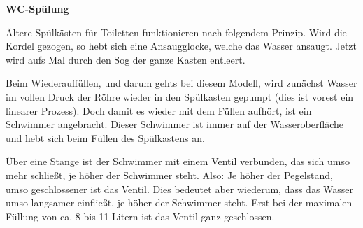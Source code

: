 
\bbwActAufgabenNr{} \textbf{WC-Spülung}\par
Ältere Spülkästen für Toiletten funktionieren nach folgendem Prinzip.
Wird die Kordel gezogen, so hebt sich eine
Ansaugglocke, welche das Wasser ansaugt. Jetzt wird aufs Mal durch den
Sog der ganze Kasten entleert.

Beim Wiederauffüllen, und darum gehts bei diesem Modell, wird zunächst
Wasser im vollen Druck der Röhre wieder in den Spülkasten
gepumpt (dies ist vorest ein linearer Prozess). Doch damit es wieder mit dem Füllen aufhört,
ist ein Schwimmer angebracht. Dieser Schwimmer ist immer auf der
Wasseroberfläche und hebt sich beim Füllen des Spülkastens an.

Über eine Stange ist der Schwimmer
mit einem Ventil verbunden, das sich umso mehr schließt, je höher der
Schwimmer steht. Also: Je höher der Pegelstand, umso geschlossener ist
das Ventil. Dies bedeutet aber wiederum, dass das Wasser umso
langsamer einfließt, je höher der Schwimmer steht. Erst bei der
maximalen Füllung von ca. 8 bis 11 Litern ist das Ventil ganz
geschlossen. 

